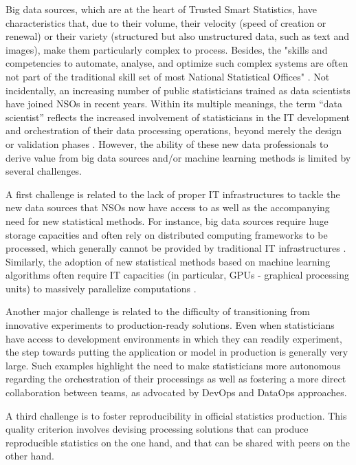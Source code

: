 Big data sources, which are at the heart of Trusted Smart Statistics, have characteristics that, due to their volume, their velocity (speed of creation or renewal) or their variety (structured but also unstructured data, such as text and images), make them particularly complex to process. Besides, the "skills and competencies to automate, analyse, and optimize such complex systems are often not part of the traditional skill set of most National Statistical Offices" \cite{ashofteh2021data}. Not incidentally, an increasing number of public statisticians trained as data scientists have joined NSOs in recent years. Within its multiple meanings, the term “data scientist” reflects the increased involvement of statisticians in the IT development and orchestration of their data processing operations, beyond merely the design or validation phases \cite{davenport2012data}. However, the ability of these new data professionals to derive value from big data sources and/or machine learning methods is limited by several challenges.

A first challenge is related to the lack of proper IT infrastructures to tackle the new data sources that NSOs now have access to as well as the accompanying need for new statistical methods. For instance, big data sources require huge storage capacities and often rely on distributed computing frameworks to be processed, which generally cannot be provided by traditional IT infrastructures \cite{liu2013computing}. Similarly, the adoption of new statistical methods based on machine learning algorithms often require IT capacities (in particular, GPUs - graphical processing units) to massively parallelize computations \cite{saiyeda2017cloud}.

Another major challenge is related to the difficulty of transitioning from innovative experiments to production-ready solutions. Even when statisticians have access to development environments in which they can readily experiment, the step towards putting the application or model in production is generally very large. Such examples highlight the need to make statisticians more autonomous regarding the orchestration of their processings as well as fostering a more direct collaboration between teams, as advocated by DevOps and DataOps approaches.

A third challenge is to foster reproducibility in official statistics production. This quality criterion involves devising processing solutions that can produce reproducible statistics on the one hand, and that can be shared with peers on the other hand.

